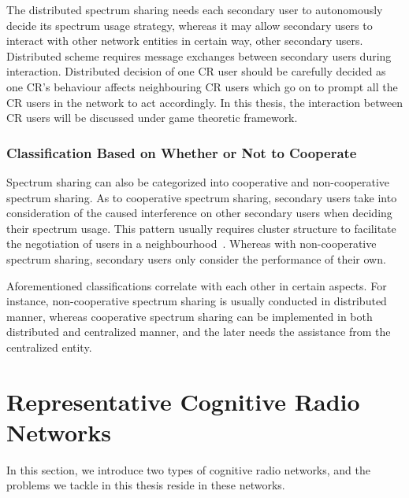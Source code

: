 The distributed spectrum sharing needs each secondary user to autonomously decide its spectrum usage strategy, whereas it may allow secondary users to interact with other network entities in certain way, \ie other secondary users.
Distributed scheme requires message exchanges between secondary users during interaction.
Distributed decision of one CR user should be carefully decided as one CR's behaviour affects neighbouring CR users which go on to prompt all the CR users in the network to act accordingly.
In this thesis, the interaction between CR users will be discussed under game theoretic framework.


\subsubsection*{Classification Based on Whether or Not to Cooperate}
Spectrum sharing can also be categorized into cooperative and non-cooperative spectrum sharing.
As to cooperative spectrum sharing, secondary users take into consideration of the caused interference on other secondary users when deciding their spectrum usage.
This pattern usually requires cluster structure to facilitate the negotiation of users in a neighbourhood~\cite{Chen07}.
Whereas with non-cooperative spectrum sharing, secondary users only consider the performance of their own.

Aforementioned classifications correlate with each other in certain aspects.
For instance, non-cooperative spectrum sharing is usually conducted in distributed manner, whereas cooperative spectrum sharing can be implemented in both distributed and centralized manner, and the later needs the assistance from the centralized entity.




\section{Representative Cognitive Radio Networks}
In this section, we introduce two types of cognitive radio networks, and the problems we tackle in this thesis reside in these networks.

